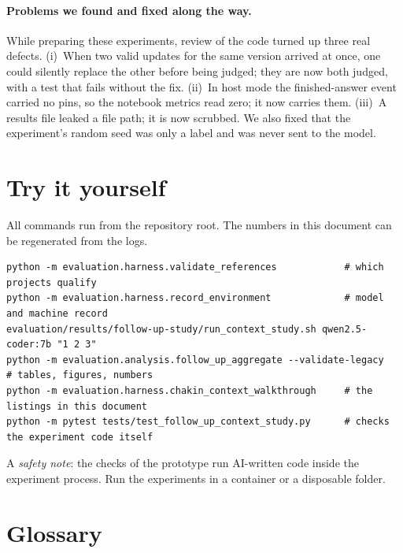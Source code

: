 \documentclass[10pt,a4paper]{article}
\begin{document}
\paragraph{Problems we found and fixed along the way.}
While preparing these experiments, review of the code turned up three real defects. (i)~When two valid updates for the
same version arrived at once, one could silently replace the other before being judged; they are now both
judged, with a test that fails without the fix. (ii)~In host mode the finished-answer event carried no pins, so
the notebook metrics read zero; it now carries them. (iii)~A results file leaked a file path; it is now
scrubbed. We also fixed that the experiment's random seed was only a label and was never sent to the model.

\section{Try it yourself}\label{sec:try}

All commands run from the repository root. The numbers in this document can be regenerated from the logs.

\begin{lstlisting}[style=raw, caption={Reproducing the results.}, label={lst:repro}]
python -m evaluation.harness.validate_references            # which projects qualify
python -m evaluation.harness.record_environment             # model and machine record
evaluation/results/follow-up-study/run_context_study.sh qwen2.5-coder:7b "1 2 3"
python -m evaluation.analysis.follow_up_aggregate --validate-legacy   # tables, figures, numbers
python -m evaluation.harness.chakin_context_walkthrough     # the listings in this document
python -m pytest tests/test_follow_up_context_study.py      # checks the experiment code itself
\end{lstlisting}

A \emph{safety note}: the checks of the prototype run AI-written code inside the experiment process. Run the
experiments in a container or a disposable folder.

\section{Glossary}\label{sec:glossary}
\end{document}

